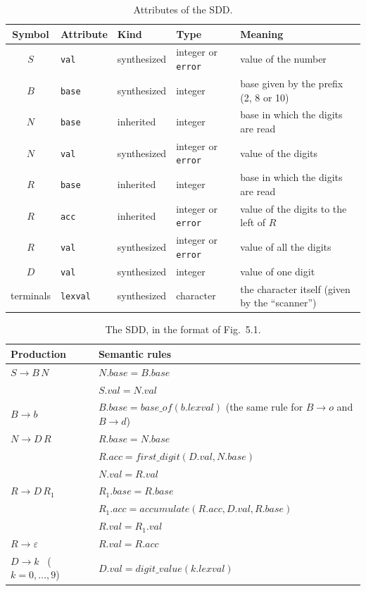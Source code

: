 \documentclass[11pt,a4paper]{article}
\newcommand{\code}[1]{\texttt{#1}}
\begin{document}
\begin{table}[H]
\centering
\small
\begin{tabular}{@{}cllll@{}}
\toprule
Symbol & Attribute & Kind & Type & Meaning \\
\midrule
$S$ & \code{val} & synthesized & integer or \code{error} & value of the number \\
$B$ & \code{base} & synthesized & integer & base given by the prefix (2, 8 or 10) \\
$N$ & \code{base} & inherited & integer & base in which the digits are read \\
$N$ & \code{val} & synthesized & integer or \code{error} & value of the digits \\
$R$ & \code{base} & inherited & integer & base in which the digits are read \\
$R$ & \code{acc} & inherited & integer or \code{error} & value of the digits to the left of $R$ \\
$R$ & \code{val} & synthesized & integer or \code{error} & value of all the digits \\
$D$ & \code{val} & synthesized & integer & value of one digit \\
terminals & \code{lexval} & synthesized & character & the character itself (given by the ``scanner'') \\
\bottomrule
\end{tabular}
\caption{Attributes of the SDD.}
\end{table}

\begin{table}[H]
\centering
\begin{tabular}{@{}ll@{}}
\toprule
Production & Semantic rules \\
\midrule
$S \to B\,N$ & $N.base = B.base$ \\
             & $S.val = N.val$ \\[2pt]
$B \to b$ & $B.base = base\_of(b.lexval)$ \quad (the same rule for $B \to o$ and $B \to d$) \\[2pt]
$N \to D\,R$ & $R.base = N.base$ \\
             & $R.acc = first\_digit(D.val, N.base)$ \\
             & $N.val = R.val$ \\[2pt]
$R \to D\,R_1$ & $R_1.base = R.base$ \\
               & $R_1.acc = accumulate(R.acc, D.val, R.base)$ \\
               & $R.val = R_1.val$ \\[2pt]
$R \to \varepsilon$ & $R.val = R.acc$ \\[2pt]
$D \to k$ \ ($k = 0,\dots,9$) & $D.val = digit\_value(k.lexval)$ \\
\bottomrule
\end{tabular}
\caption{The SDD, in the format of Fig.~5.1.}
\end{table}
\end{document}
